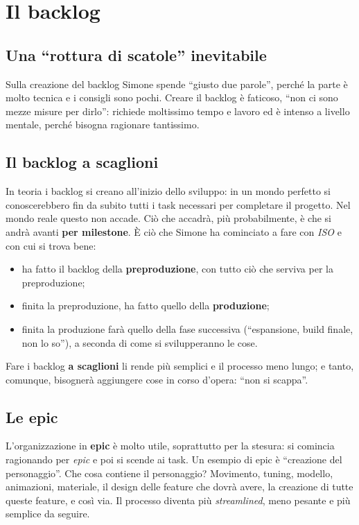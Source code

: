 \section{Il backlog}
\label{sec:z3-backlog-simone}

\subsection{Una ``rottura di scatole'' inevitabile}

Sulla creazione del backlog Simone spende ``giusto due parole'', perché la
parte è molto tecnica e i consigli sono pochi. Creare il backlog è faticoso,
``non ci sono mezze misure per dirlo'': richiede moltissimo tempo e lavoro ed
è intenso a livello mentale, perché bisogna ragionare tantissimo.

\subsection{Il backlog a scaglioni}

In teoria i backlog si creano all'inizio dello sviluppo: in un mondo perfetto
si conoscerebbero fin da subito tutti i task necessari per completare il
progetto. Nel mondo reale questo non accade. Ciò che accadrà, più
probabilmente, è che si andrà avanti \textbf{per milestone}. È ciò che Simone
ha cominciato a fare con \emph{ISO} e con cui si trova bene:
\begin{itemize}
  \item ha fatto il backlog della \textbf{preproduzione}, con tutto ciò che
        serviva per la preproduzione;
  \item finita la preproduzione, ha fatto quello della \textbf{produzione};
  \item finita la produzione farà quello della fase successiva
        (``espansione, build finale, non lo so''), a seconda di come si
        svilupperanno le cose.
\end{itemize}
Fare i backlog \textbf{a scaglioni} li rende più semplici e il processo meno
lungo; e tanto, comunque, bisognerà aggiungere cose in corso d'opera: ``non si
scappa''.

\subsection{Le epic}

L'organizzazione in \textbf{epic} è molto utile, soprattutto per la stesura:
si comincia ragionando per \emph{epic} e poi si scende ai task. Un esempio di
epic è ``creazione del personaggio''. Che cosa contiene il personaggio?
Movimento, tuning, modello, animazioni, materiale, il design delle feature
che dovrà avere, la creazione di tutte queste feature, e così via. Il
processo diventa più \emph{streamlined}, meno pesante e più semplice da
seguire.

